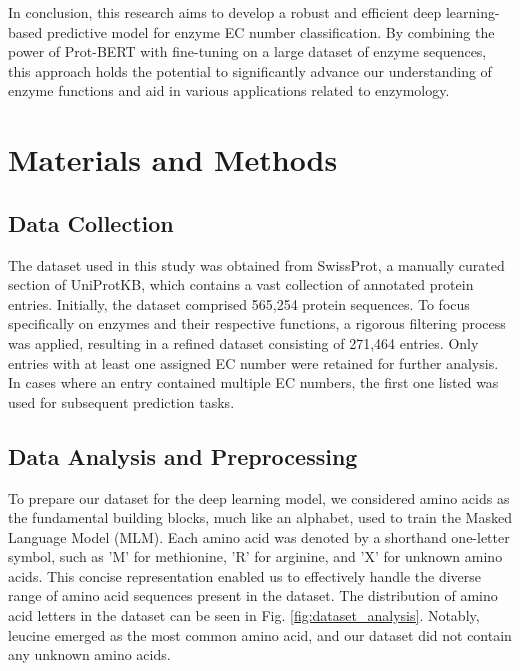 \documentclass[conference]{IEEEtran}
\begin{document}
In conclusion, this research aims to develop a robust and efficient deep learning-based predictive model for enzyme EC number classification. By combining the power of Prot-BERT with fine-tuning on a large dataset of enzyme sequences, this approach holds the potential to significantly advance our understanding of enzyme functions and aid in various applications related to enzymology.

\section{Materials and Methods}\label{sec11}

\subsection{Data Collection}

The dataset used in this study was obtained from SwissProt, a manually curated section of UniProtKB, which contains a vast collection of annotated protein entries. Initially, the dataset comprised 565,254 protein sequences. To focus specifically on enzymes and their respective functions, a rigorous filtering process was applied, resulting in a refined dataset consisting of 271,464 entries. Only entries with at least one assigned EC number were retained for further analysis. In cases where an entry contained multiple EC numbers, the first one listed was used for subsequent prediction tasks.



\subsection{Data Analysis and Preprocessing}

To prepare our dataset for the deep learning model, we considered amino acids as the fundamental building blocks, much like an alphabet, used to train the Masked Language Model (MLM). Each amino acid was denoted by a shorthand one-letter symbol, such as 'M' for methionine, 'R' for arginine, and 'X' for unknown amino acids. This concise representation enabled us to effectively handle the diverse range of amino acid sequences present in the dataset. The distribution of amino acid letters in the dataset can be seen in Fig. \ref{fig:dataset_analysis}. Notably, leucine emerged as the most common amino acid, and our dataset did not contain any unknown amino acids.
\end{document}

